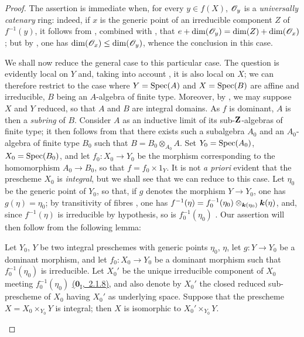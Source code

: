 \begin{proof}
The assertion is immediate when, for every $y\in f(X)$, $\mathscr{O}_y$ is a \emph{universally catenary} ring: indeed, if $x$ is the generic point of an irreducible component $Z$ of $f^{-1}(y)$, it follows from , combined with , that $e+\dim(\mathscr{O}_y)=\dim(Z)+\dim(\mathscr{O}_x)$; but by , one has $\dim(\mathscr{O}_x)\leq\dim(\mathscr{O}_y)$, whence the conclusion in this case.

We shall now reduce the general case to this particular case.
The question is evidently local on $Y$ and, taking into account , it is also local on $X$; we can therefore restrict to the case where $Y=\operatorname{Spec}(A)$ and $X=\operatorname{Spec}(B)$ are affine and irreducible, $B$ being an $A$-algebra of finite type.
Moreover, by , we may suppose $X$ and $Y$ reduced, so that $A$ and $B$ are integral domains.
As $f$ is dominant, $A$ is then a \emph{subring} of $B$.
Consider $A$ as an inductive limit of its sub-$\mathbf{Z}$-algebras of finite type; it then follows from  that there exists such a subalgebra $A_0$ and an $A_0$-algebra of finite type $B_0$ such that $B=B_0\otimes_{A_0}A$.
Set $Y_0=\operatorname{Spec}(A_0)$, $X_0=\operatorname{Spec}(B_0)$, and let $f_0:X_0\to Y_0$ be the morphism corresponding to the homomorphism $A_0\to B_0$, so that $f=f_0\times 1_Y$.
It is not \emph{a priori} evident that the prescheme $X_0$ is \emph{integral}, but we shall see that we can reduce to this case.
Let $\eta_0$ be the generic point of $Y_0$, so that, if $g$ denotes the morphism $Y\to Y_0$, one has $g(\eta)=\eta_0$; by transitivity of fibres , one has $f^{-1}(\eta)=f_0^{-1}(\eta_0)\otimes_{\boldsymbol{k}(\eta_0)}\boldsymbol{k}(\eta)$, and, since $f^{-1}(\eta)$ is irreducible by hypothesis, so is $f_0^{-1}(\eta_0)$ .
Our assertion will then follow from the following lemma:

\begin{lemma}[13.1.2]
\label{IV.13.1.2}
Let $Y_0$, $Y$ be two integral preschemes with generic points $\eta_0$, $\eta$, let $g:Y\to Y_0$ be a dominant morphism, and let $f_0:X_0\to Y_0$ be a dominant morphism such that $f_0^{-1}(\eta_0)$ is irreducible.
Let $X_0'$ be the unique irreducible component of $X_0$ meeting $f_0^{-1}(\eta_0)$ \hyperref[0.2.1.8]{($\mathbf{0}_{\mathrm{I}}$,~2.1.8)}, and also denote by $X_0'$ the closed reduced sub-prescheme of $X_0$ having $X_0'$ as underlying space.
Suppose that the prescheme $X=X_0\times_{Y_0}Y$ is integral; then $X$ is isomorphic to $X_0'\times_{Y_0}Y$.
\end{lemma}


\end{proof}
